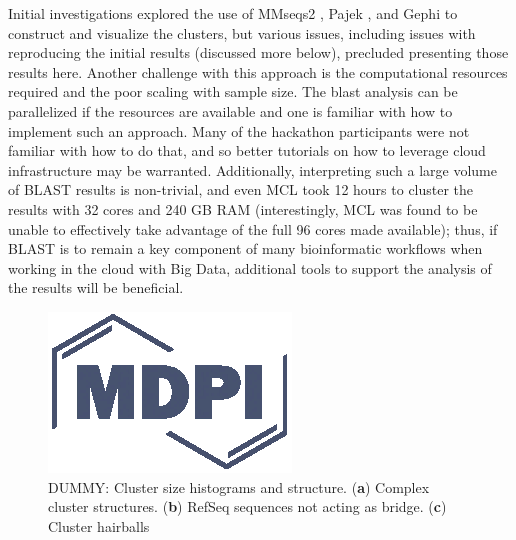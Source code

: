 \documentclass[genes, moreauthors]{Definitions/mdpi}
\begin{document}
  Initial investigations explored the use of MMseqs2 \cite{Mirdita2019}, Pajek
  \cite{Batagelj2004}, and  Gephi \cite{Bastian2009} to construct and visualize
  the clusters, but various issues, including issues with reproducing the
  initial results (discussed more below), precluded presenting those results
  here. Another challenge with this approach is the computational resources
  required and the poor scaling with sample size. The blast analysis can be
  parallelized if the resources are available and one is familiar with how to
  implement such an approach. Many of the hackathon participants were not
  familiar with how to do that, and so better tutorials on how to leverage
  cloud infrastructure may be warranted. Additionally, interpreting such a
  large volume of BLAST results is non-trivial, and even MCL took 12 hours to
  cluster the results with 32 cores and 240 GB RAM (interestingly, MCL was
  found to be unable to effectively take advantage of the full 96 cores made
  available); thus, if BLAST is to remain a key component of many bioinformatic
  workflows when working in the cloud with Big Data, additional tools to
  support the analysis of the results will be beneficial.

  \begin{figure}
    \centering
    \includegraphics{Definitions/logo-mdpi}
    \caption{DUMMY: Cluster size histograms and structure. (\textbf{a}) Complex
    cluster structures. (\textbf{b}) RefSeq sequences not acting as bridge.
    (\textbf{c}) Cluster hairballs
            \label{fig:cluster_sizes}}
  \end{figure}
\end{document}
